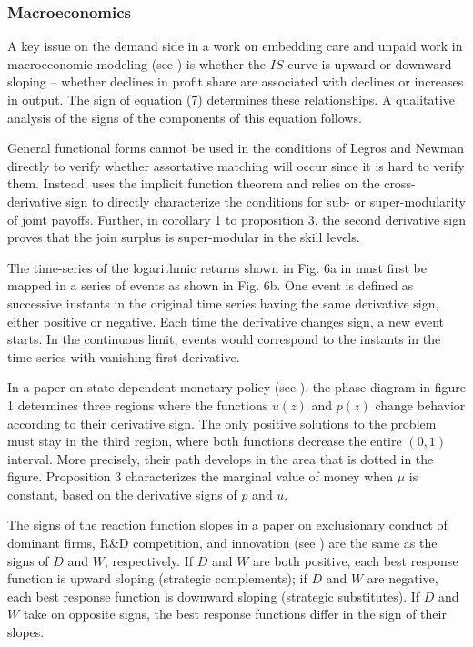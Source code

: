 \documentclass[11pt]{book}
\begin{document}

\subsubsection{Macroeconomics}


A key issue on the demand side in a work on embedding care and unpaid
work in macroeconomic modeling (see \cite{braunstein2011embedding})
is whether the $IS$ curve is upward or downward sloping -- whether
declines in profit share are associated with declines or increases
in output. The sign of equation (7) determines these relationships.
A qualitative analysis of the signs of the components of this equation
follows.

General functional forms cannot be used in the conditions of Legros
and Newman directly to verify whether assortative matching will occur
since it is hard to verify them. Instead, \cite{ghatak2011contractual}
uses the implicit function theorem and relies on the cross-derivative
sign to directly characterize the conditions for sub- or super-modularity
of joint payoffs. Further, in corollary 1 to proposition 3, the second
derivative sign proves that the join surplus is super-modular in the
skill levels.

The time-series of the logarithmic returns shown in Fig. 6a in \cite{da2012heavy}
must first be mapped in a series of events as shown in Fig. 6b. One
event is defined as successive instants in the original time series
having the same derivative sign, either positive or negative. Each
time the derivative changes sign, a new event starts. In the continuous
limit, events would correspond to the instants in the time series
with vanishing first-derivative.

In a paper on state dependent monetary
policy (see \cite{lippi2014state}), the phase diagram in figure 1 determines
three regions where the functions $u\left(z\right)$ and $p\left(z\right)$
change behavior according to their derivative sign. The only positive
solutions to the problem must stay in the third region, where both
functions decrease the entire $\left(0,1\right)$ interval. More precisely,
their path develops in the area that is dotted in the figure. Proposition
3 characterizes the marginal value of money when $\mu$ is constant,
based on the derivative signs of $p$ and $u$.

The signs of the reaction function slopes in a paper on exclusionary conduct of dominant firms, R\&D competition, and
innovation (see \cite{baker2016exclusionary})
are the same as the signs of $D$ and $W$, respectively. If $D$
and $W$ are both positive, each best response function is upward
sloping (strategic complements); if $D$ and $W$ are negative, each
best response function is downward sloping (strategic substitutes).
If $D$ and $W$ take on opposite signs, the best response functions
differ in the sign of their slopes.
\end{document}
